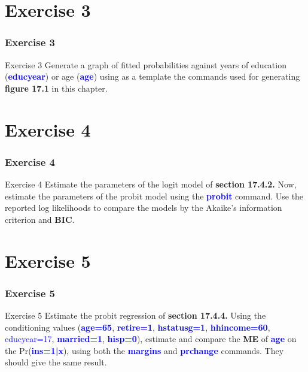\documentclass[11pt, aspectratio=169]{beamer}
\begin{document}
	\section{Exercise 3}
		\begin{frame}
			\frametitle{Exercise 3}
			\begin{block}{Exercise 3}
				Generate a graph of fitted probabilities against years of education
				(\textcolor{blue}{\textbf{educyear}}) or age (\textcolor{blue}{\textbf{age}}) using as a template the commands used for
				generating \textcolor{green!75}{\textbf{figure 17.1}} in this chapter.
			\end{block}
		\end{frame}
	\section{Exercise 4}
		\begin{frame}
			\frametitle{Exercise 4}
			\begin{block}{Exercise 4}
				Estimate the parameters of the logit model of \textcolor{red!50}{\textbf{section 17.4.2.}} Now,
				estimate the parameters of the probit model using the \textcolor{blue}{\textbf{probit}}
				command. Use the reported log likelihoods to compare the models by
				the Akaike’s information criterion and \textbf{BIC}.
			\end{block}
		\end{frame}
	\section{Exercise 5}
		\begin{frame}
			\frametitle{Exercise 5}
			\begin{block}{Exercise 5}
				Estimate the probit regression of \textcolor{red!50}{\textbf{section 17.4.4.}} Using the
				conditioning values (\textcolor{blue}{\textbf{age=65}}, \textcolor{blue}{\textbf{retire=1}}, \textcolor{blue}{\textbf{hstatusg=1}}, \textcolor{blue}{\textbf{hhincome=60}},
				\textcolor{blue}{educyear=17}, \textcolor{blue}{\textbf{married=1}}, \textcolor{blue}{\textbf{hisp=0}}), estimate and compare the \textbf{ME} of
				\textcolor{blue}{\textbf{age}} on the Pr(\textcolor{blue}{\textbf{ins=1|x}}), using both the \textcolor{blue}{\textbf{margins}} and \textcolor{blue}{\textbf{prchange}}
				commands. They should give the same result.
			\end{block}
		\end{frame}
\end{document}
